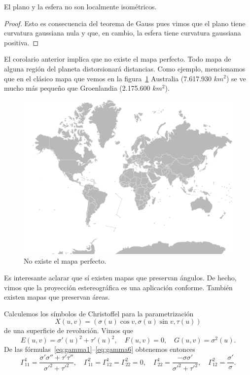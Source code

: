 \begin{corollary}
	El plano y la esfera no son localmente isométricos.
\end{corollary}

\begin{proof}
	Esto es consecuencia del teorema de Gauss pues vimos que el plano tiene
	curvatura gaussiana nula y que, en cambio, la esfera tiene curvatura
	gaussiana positiva. 
\end{proof}

El corolario anterior implica que no existe el mapa perfecto. Todo mapa de
alguna región del planeta distorsionará distancias. Como ejemplo, mencionamos
que en el clásico mapa que vemos en la figura~\ref{fig:mapa} Australia
(7.617.930 $km^2$) se ve mucho más pequeño que Groenlandia (2.175.600 $km^2$). 

\begin{figure}
		\centering
    	\includegraphics[scale=0.15]{eps/mercator}
		\caption{No existe el mapa perfecto.}
		\label{fig:mapa}
\end{figure}
	
Es interesante aclarar que sí existen mapas que preservan ángulos. De hecho,
vimos que la proyección estereográfica es una aplicación conforme. También
existen mapas que preservan áreas. 

\begin{example}
	Calculemos los símbolos de Christoffel para la parametrización
	\[
		X(u,v)=(\sigma(u)\cos v,\sigma(u)\sin v,\tau(u))
	\]
	de una superficie de revolución. Vimos que
	\[
		E(u,v)=\sigma'(u)^2+\tau'(u)^2,\quad
		F(u,v)=0,\quad
		G(u,v)=\sigma^2(u).
	\]
	De las fórmulas~\eqref{eq:gamma1}--\eqref{eq:gamma6} obtenemos entonces 
	\[
		\Gamma_{11}^1=\frac{\sigma'\sigma''+\tau'\tau''}{\sigma'^2+\tau'^2},\quad
		\Gamma_{11}^2=\Gamma_{12}^1=\Gamma_{22}^2=0,\quad
		\Gamma_{22}^1=\frac{-\sigma\sigma'}{\sigma'^2+\tau'^2},\quad
		\Gamma_{12}^2=\frac{\sigma'}{\sigma}.
	\]
\end{example}

